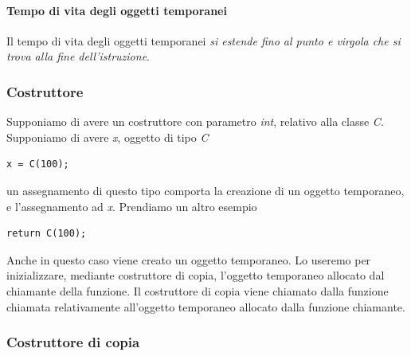 \documentclass[11pt]{report}
\theoremstyle{definition}
\begin{document}
\paragraph{Tempo di vita degli oggetti temporanei} Il tempo di vita degli oggetti temporanei \emph{si estende fino al punto e virgola che si trova alla fine dell'istruzione}.
\subsubsection{Costruttore}
Supponiamo di avere un costruttore con parametro \emph{int}, relativo alla classe \emph{C}. Supponiamo di avere \emph{x}, oggetto di tipo \emph{C}
\begin{verbatim}
x = C(100);
\end{verbatim}
un assegnamento di questo tipo comporta la creazione di un oggetto temporaneo, e l'assegnamento ad \emph{x}. Prendiamo un altro esempio
\begin{verbatim}
return C(100);
\end{verbatim}
Anche in questo caso viene creato un oggetto temporaneo.  Lo useremo per inizializzare, mediante costruttore di copia, l'oggetto temporaneo allocato dal chiamante della funzione. Il costruttore di copia viene chiamato dalla funzione chiamata relativamente all'oggetto temporaneo allocato dalla funzione chiamante.

\subsubsection{Costruttore di copia}
\end{document}
